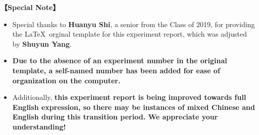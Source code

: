 	
\textbf{【Special Note】}	
\begin{itemize}
	\item Special thanks to \textbf{Huanyu Shi}, a senior from the Class of 2019, for providing the \LaTeX \ orginal template for this experiment report, which was adjusted by \textbf{Shuyun Yang}. 
	
	\item \textbf{Due to the absence of an experiment number in the original template, a self-named number has been added for ease of organization on the computer.} 
	
	\item Additionally, \textcolor{fred}{\large\textbf{this experiment report is being improved towards full English expression, so there may be instances of mixed Chinese and English during this transition period. We appreciate your understanding!}}
\end{itemize}
	

\clearpage
\tableofcontents		